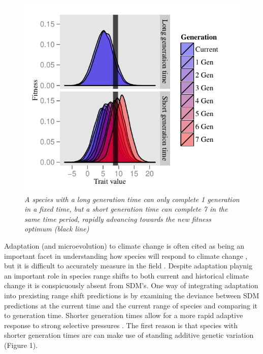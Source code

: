 \documentclass[pdftex,11pt,a4paper]{article}\usepackage{graphicx, color}
\makeatletter
\def\maxwidth{ %
  \ifdim\Gin@nat@width>\linewidth
    \linewidth
  \else
    \Gin@nat@width
  \fi
}
\newenvironment{knitrout}{}{} %
\makeatother
\begin{document}
\begin{figure}
\begin{knitrout}
\color{fgcolor}\includegraphics[width=\maxwidth]{figure/add_demo} 
\end{knitrout}

\caption{ \footnotesize{ \textit{A species with a long generation time can only complete 1 generation in a fixed time, but a short generation time can complete 7 in the same time period, rapidly advancing towards the new fitness optimum (black line)  }}\label{fig:add_demo}}
\end{figure}
Adaptation (and microevolution) to climate change is often cited as being an important facet in understanding how species will respond to climate change \citep{Visser2008,lavergne2010biodiversity,Hoffmann2011}, but it is difficult to accurately measure in the field \citep{Hansen2012}.
Despite adaptation playnig an important role in species range shifts to both current \citep{Thomas2001,Bridle2007} and historical climate change \citep{Davis2001} it is conspicuously absent from SDM's.  One way of integrating adaptation into prexisting range shift predictions is by examining the deviance between SDM predictions at the current time and the current range of species and comparing it to generation time.
Shorter generation times allow for a more rapid adaptive response to strong selective pressures \citep{Berteaux2004,Somero2010,Reed2011,Shaw2012,Walters2012}.  The first reason is that species with shorter generation times are can make use of standing additive genetic variation (Figure 1). 
\end{document}
